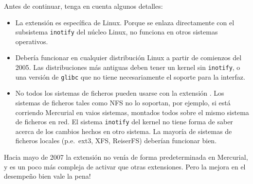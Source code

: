 Antes de continuar, tenga en cuenta algunos detalles:
\begin{itemize}
\item La extensión  es específica de Linux.  Porque se
  enlaza directamente con el subsistema \texttt{inotify} del núcleo
  Linux, no funciona en otros sistemas operativos.
\item Debería funcionar en cualquier distribución Linux a partir de
  comienzos del 2005.  Las distribuciones más antiguas deben tener un
  kernel sin \texttt{inotify}, o una versión de \texttt{glibc} que no
  tiene necesariamente el soporte para la interfaz.
\item No todos los sistemas de ficheros pueden usarse con la extensión
  .  Los sistemas de ficheros tales como NFS no lo
  soportan, por ejemplo, si está corriendo Mercurial en vaios
  sistemas, montados todos sobre el mismo sistema de ficheros en red.
  El sistema \texttt{inotify} del kernel no tiene forma de saber
  acerca de los cambios hechos en otro sistema.  La mayoría de
  sistemas de ficheros locales (p.e.~ext3, XFS, ReiserFS) deberían
  funcionar bien.
\end{itemize}

Hacia mayo de 2007 la extensión  no venía de forma
predeterminada en Mercurial, y es
un poco más compleja de activar que otras extensiones.  Pero la mejora
en el desempeño bien vale la pena!

